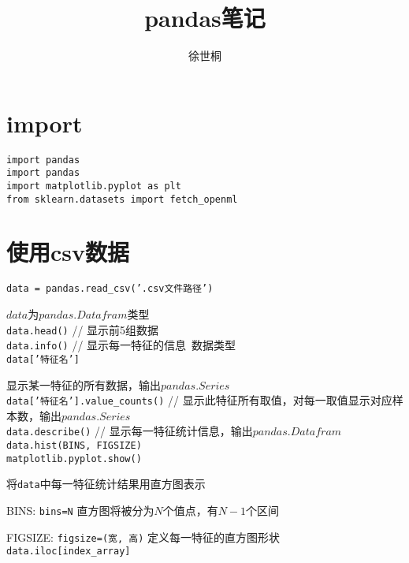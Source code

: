 \documentclass[UTF8]{ctexart}
\title{pandas笔记}
\author{徐世桐}
\date{}
\begin{document}
\maketitle

\section{import}
\noindent \texttt{import pandas}\\
\texttt{import pandas}\\
\texttt{import matplotlib.pyplot as plt}\\
\texttt{from sklearn.datasets import fetch\_openml}

\section{使用csv数据}
\texttt{data = pandas.read\_csv('.csv文件路径')}

  $data$为$pandas.Datafram$类型\\
\texttt{data.head()} // 显示前5组数据\\
\texttt{data.info()} // 显示每一特征的信息\ 数据类型\\
\texttt{data['特征名']} 
  
  显示某一特征的所有数据，输出$pandas.Series$\\
\texttt{data['特征名'].value\_counts()} // 显示此特征所有取值，对每一取值显示对应样本数，输出$pandas.Series$\\
\texttt{data.describe()} // 显示每一特征统计信息，输出$pandas.Datafram$\\
\texttt{data.hist(BINS, FIGSIZE)}\\
\texttt{matplotlib.pyplot.show()}

  将\texttt{data}中每一特征统计结果用直方图表示

  BINS: \texttt{bins=N} 直方图将被分为$N$个值点，有$N-1$个区间

  FIGSIZE: \texttt{figsize=(宽, 高)} 定义每一特征的直方图形状\\
\texttt{data.iloc[index\_array]}
\end{document}
